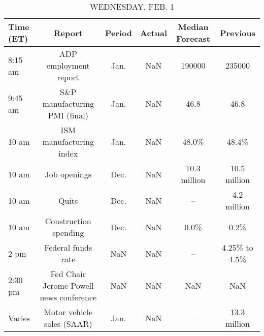 \documentclass{article}%
\begin{document}
\begin{table}[htbp]%
\caption{WEDNESDAY, FEB. 1}%
\centering%
\begin{adjustbox}{width=1\textwidth}%
\begin{tabular}{lccccc}
\toprule
Time (ET) &                                  Report & Period & Actual & Median Forecast &      Previous \\
\midrule
  8:15 am &                   ADP employment report &   Jan. &    NaN &          190000 &        235000 \\
  9:45 am &           S\&P manufacturing PMI (final) &   Jan. &    NaN &            46.8 &          46.8 \\
    10 am &                 ISM manufacturing index &   Jan. &    NaN &           48.0\% &         48.4\% \\
    10 am &                            Job openings &   Dec. &    NaN &    10.3 million &  10.5 million \\
    10 am &                                   Quits &   Dec. &    NaN &              -- &   4.2 million \\
    10 am &                   Construction spending &   Dec. &    NaN &            0.0\% &          0.2\% \\
     2 pm &                      Federal funds rate &    NaN &    NaN &              -- & 4.25\% to 4.5\% \\
  2:30 pm & Fed Chair Jerome Powell news conference &    NaN &    NaN &             NaN &           NaN \\
   Varies &              Motor vehicle sales (SAAR) &   Jan. &    NaN &              -- &  13.3 million \\
\bottomrule
\end{tabular}
%
\end{adjustbox}%
\end{table}

%
\end{document}
